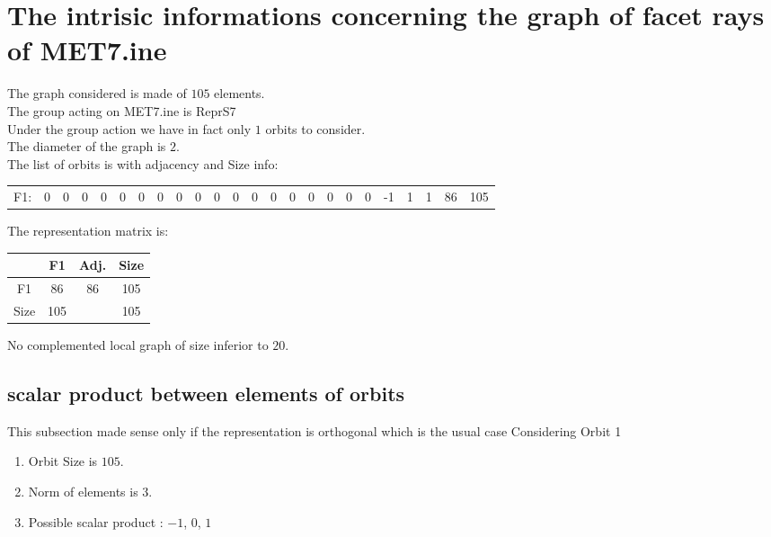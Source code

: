 \documentclass[12pt]{article}
\begin{document}
\section{The intrisic informations concerning the graph of facet rays of MET7.ine}
The graph considered is made of $105$ elements.\\
The group acting on MET7.ine is ReprS7\\
Under the group action we have in fact only $1$ orbits to consider.\\
The diameter of the graph is $2$.\\
The list of orbits is with adjacency and Size info:
\begin{center}
\scriptsize
\begin{tabular}{cccccccccccccccccccccc|c|c}
F1:&0&0&0&0&0&0&0&0&0&0&0&0&0&0&0&0&0&0&-1&1&1&86&105\\
\end{tabular}
\end{center}
The representation matrix is:
\begin{center}
\scriptsize
\begin{tabular}{|c|c|c|c|}
\hline
&F1&Adj.&Size\\
\hline
F1& 86&86&105\\
\hline
Size&105&&105\\
\hline
\end{tabular}
\end{center}
No complemented local graph of size inferior to $20$.
\subsection{scalar product between elements of orbits}
\noindent This subsection made sense only if the representation is orthogonal which is the usual case
Considering Orbit 1
\begin{enumerate}
\item Orbit Size is $105$.
\item Norm of elements is $3$.
\item Possible scalar product : $-1$, $0$, $1$
\end{enumerate}
\end{document}
